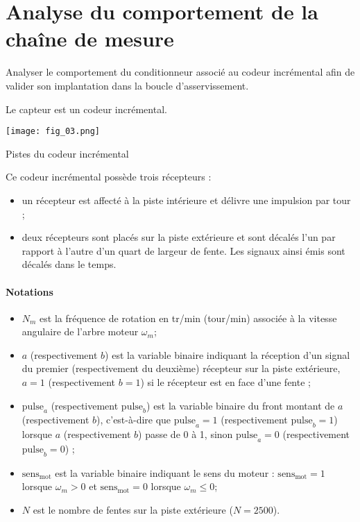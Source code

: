 \section{Analyse du comportement de la chaîne de mesure}
\begin{obj}
Analyser le comportement du conditionneur associé au codeur incrémental afin de valider son implantation dans la boucle d’asservissement.
\end{obj}

Le capteur est un codeur incrémental.

\begin{marginfigure}
\texttt{[image: fig\_03.png]}
\caption{Pistes du codeur incrémental\label{fig_03}}
\end{marginfigure}

Ce codeur incrémental possède trois récepteurs :
\begin{itemize}
\item un récepteur est affecté à la piste intérieure et délivre une impulsion par tour ;
\item deux récepteurs sont placés sur la piste extérieure et sont décalés l’un par rapport à l’autre d’un quart de largeur de fente. Les signaux ainsi émis sont décalés dans le temps.
\end{itemize}

\paragraph*{Notations}

\begin{itemize}
\item $N_m$ est la fréquence de rotation en \si{tr/min} (\si{tour/min}) associée à la vitesse angulaire de l’arbre moteur $\omega_m$;
\item $a$ (respectivement $b$) est la variable binaire indiquant la réception d’un signal du premier (respectivement du deuxième) récepteur sur la piste extérieure, $a=1$ (respectivement $b=1$) si le récepteur est en face d’une fente ;
\item $\text{pulse}_a$ (respectivement $\text{pulse}_b$) est la variable binaire du front montant de $a$ (respectivement $b$), c’est-à-dire que $\text{pulse}_a=1$ (respectivement $\text{pulse}_b=1$) lorsque $a$ (respectivement $b$) passe de 0 à 1, sinon $\text{pulse}_a= 0$ (respectivement $\text{pulse}_b = 0$) ;
\item $\text{sens}_{\text{mot}}$ est la variable binaire indiquant le sens du moteur : $\text{sens}_{\text{mot}}=1$ lorsque $\omega_m>0$ et $\text{sens}_{\text{mot}}=0$ lorsque $\omega_m\leq 0$;
\item $N$ est le nombre de fentes sur la piste extérieure ($N=2500$).
\end{itemize}

